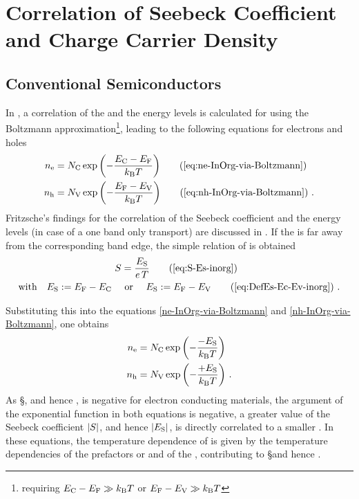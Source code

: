 \newpage
\section{Correlation of Seebeck Coefficient and Charge Carrier Density}%
\label{sec:CCD-v-S}
\subsection{Conventional Semiconductors}
In , a correlation of the \nLong and the energy levels is calculated for \CSCs using the Boltzmann approximation\footnote{requiring $E_\text{C}-E_\text{F}\gg k_\text{B}T$ or $E_\text{F}-E_\text{V}\gg k_\text{B}T$}, leading to the following equations for electrons and holes
\begin{align}
\ne &=\Nc\exp{-\frac{\Ec-\Ef}{\kT}} %
\tag{\ref{eq:ne-InOrg-via-Boltzmann}}
\\
\nh &=\Nv\exp{-\frac{\Ef-\Ev}{\kT}}
\tag{\ref{eq:nh-InOrg-via-Boltzmann}}
\PUNKT
\end{align}
Fritzsche's findings for the correlation of the Seebeck coefficient and the energy levels (in case of a one band only transport)
are discussed in . If the \EfLong is far away from the corresponding band edge, the simple relation of  is obtained
\begin{align}
\S &= \frac{\Es}{e\,\T}
\tag{\ref{eq:S-Es-inorg}}
\\
\text{with} \quad \Es := \Ef-\Ec \quad&\text{ or }\quad \Es := \Ef-\Ev
\tag{\ref{eq:DefEs-Ec-Ev-inorg}}
\PUNKT
\end{align}


%
Substituting this  into the equations \eqref{ne-InOrg-via-Boltzmann} and \eqref{nh-InOrg-via-Boltzmann}, one obtains
\begin{align}
\ne &=\Nc\exp{-\frac{-\Es}{\kT}}
\label{eq:ne-von-Es-inorg}
\\
\nh &=\Nv\exp{-\frac{+\Es}{\kT}}
\label{eq:nh-von-Es-inorg}
\PUNKT
\end{align}
As \S, and hence \Es, is negative for electron conducting materials, the argument of the exponential function in both equations is negative, \eg a greater value of the Seebeck coefficient $|\S|$, and hence $|\Es|$, is directly correlated to a smaller \nLong \neh. In these equations, the temperature dependence of \neh is given by the temperature dependencies of the prefactors \Nc or \Nv and of the \EfLong \Ef, contributing to \S and hence \Es.

